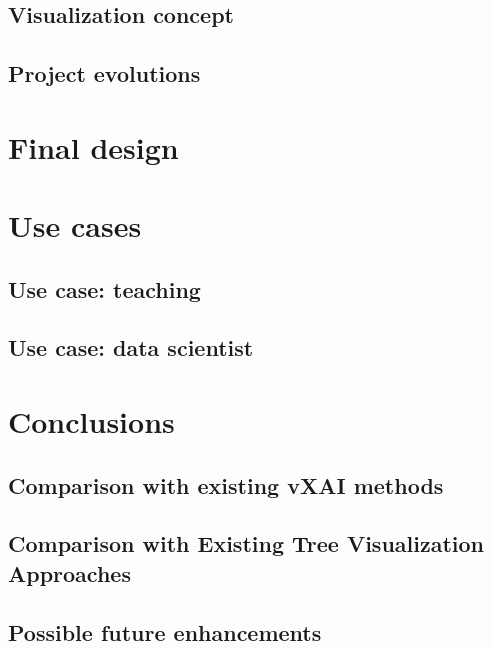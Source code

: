     \section{Visualization concept}
    
    
    \section{Project evolutions}
    

\chapter{Final design}\label{cap:finalDesign}
    
    

\chapter{Use cases}    
    
    \section{Use case: teaching}
        
    
    \section{Use case: data scientist}
        

\chapter{Conclusions}
    
    \section{Comparison with existing vXAI methods}\label{sec:comparison_vxai}
        

    \section{Comparison with Existing Tree Visualization Approaches}\label{sec:comparison_trees_conclusion}
        

    \section{Possible future enhancements}\label{sec:future enanchements}
        

